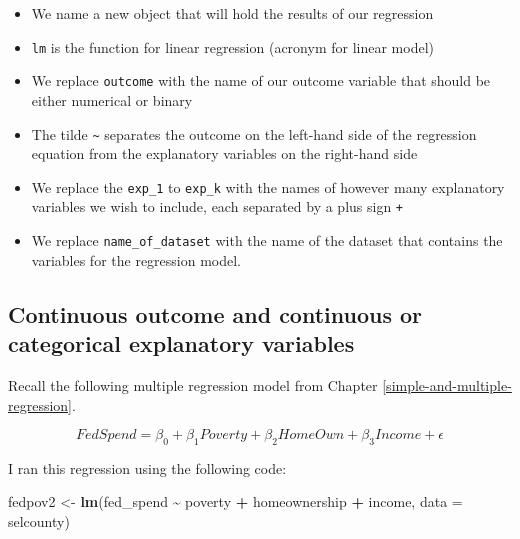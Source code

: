 \documentclass[
]{book}
\makeatletter
\newenvironment{Shaded}{\begin{snugshade}}{\end{snugshade}}
\newcommand{\AttributeTok}[1]{\textcolor[rgb]{0.27,0.27,0.27}{#1}}
\newcommand{\FunctionTok}[1]{\textcolor[rgb]{0.27,0.27,0.27}{\textbf{#1}}}
\newcommand{\NormalTok}[1]{#1}
\newcommand{\OtherTok}[1]{\textcolor[rgb]{0.37,0.37,0.37}{#1}}
\newcommand{\SpecialCharTok}[1]{\textcolor[rgb]{0.43,0.43,0.43}{\textbf{#1}}}
\providecommand{\tightlist}{%
  \setlength{\itemsep}{0pt}\setlength{\parskip}{0pt}}
\newenvironment{kframe}{%
\medskip{}
\setlength{\fboxsep}{.8em}
 \def\at@end@of@kframe{}%
 \ifinner\ifhmode%
  \def\at@end@of@kframe{\end{minipage}}%
  \begin{minipage}{\columnwidth}%
 \fi\fi%
 \def\FrameCommand##1{\hskip\@totalleftmargin \hskip-\fboxsep
 \colorbox{shadecolor}{##1}\hskip-\fboxsep
     \hskip-\linewidth \hskip-\@totalleftmargin \hskip\columnwidth}%
 \MakeFramed {\advance\hsize-\width
   \@totalleftmargin\z@ \linewidth\hsize
   \@setminipage}}%
 {\par\unskip\endMakeFramed%
 \at@end@of@kframe}
\renewenvironment{Shaded}{\begin{kframe}}{\end{kframe}}
\makeatother
\begin{document}
\begin{itemize}
\tightlist
\item
  We name a new object that will hold the results of our regression
\item
  \texttt{lm} is the function for linear regression (acronym for linear model)
\item
  We replace \texttt{outcome} with the name of our outcome variable that should be either numerical or binary
\item
  The tilde \texttt{\textasciitilde{}} separates the outcome on the left-hand side of the regression equation from the explanatory variables on the right-hand side
\item
  We replace the \texttt{exp\_1} to \texttt{exp\_k} with the names of however many explanatory variables we wish to include, each separated by a plus sign \texttt{+}
\item
  We replace \texttt{name\_of\_dataset} with the name of the dataset that contains the variables for the regression model.
\end{itemize}

\hypertarget{continuous-outcome-and-continuous-or-categorical-explanatory-variables}{%
\subsection{Continuous outcome and continuous or categorical explanatory variables}\label{continuous-outcome-and-continuous-or-categorical-explanatory-variables}}

Recall the following multiple regression model from Chapter \ref{simple-and-multiple-regression}.

\begin{equation}
FedSpend = \beta_0 + \beta_1Poverty + \beta_2HomeOwn + \beta_3Income + \epsilon
\label{eq:multregexrep}
\end{equation}

I ran this regression using the following code:

\begin{Shaded}
\begin{Highlighting}[]
\NormalTok{fedpov2 }\OtherTok{\textless{}{-}} \FunctionTok{lm}\NormalTok{(fed\_spend }\SpecialCharTok{\textasciitilde{}}\NormalTok{ poverty }\SpecialCharTok{+}\NormalTok{ homeownership }\SpecialCharTok{+}\NormalTok{ income, }\AttributeTok{data =}\NormalTok{ selcounty)}
\end{Highlighting}
\end{Shaded}
\end{document}
